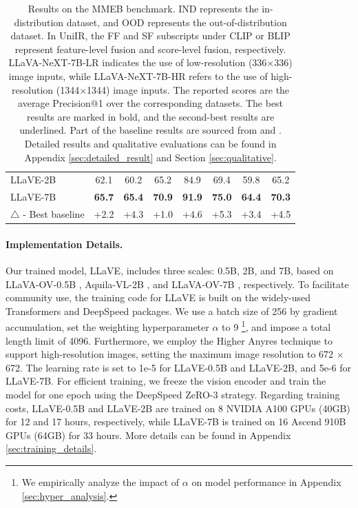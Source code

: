 \documentclass[11pt]{article}
\begin{document}
\begin{table}[t]
\begin{tabular}{lccccccc}
LLaVE-2B                                            & 62.1           & 60.2          & 65.2          & 84.9          & 69.4          & 59.8          & 65.2          \\
LLaVE-7B                                            & \textbf{65.7}  & \textbf{65.4} & \textbf{70.9} & \textbf{91.9} & \textbf{75.0} & \textbf{64.4} & \textbf{70.3} \\
\rowcolor[HTML]{FFFACD}
$\triangle$ - Best baseline                                            & +2.2  & +4.3 & +1.0 & +4.6 & +5.3 & +3.4 & +4.5 \\

\bottomrule
\end{tabular}
\vspace{-0.2cm}
\caption{Results on the MMEB benchmark. IND represents the in-distribution dataset, and OOD represents the out-of-distribution dataset. In UniIR, the FF and SF subscripts under CLIP or BLIP represent feature-level fusion and score-level fusion, respectively. LLaVA-NeXT-7B-LR indicates the use of low-resolution (336×336) image inputs, while LLaVA-NeXT-7B-HR refers to the use of high-resolution (1344×1344) image inputs. The reported scores are the average Precision@1 over the corresponding datasets. The best results are marked in bold, and the second-best results are underlined. Part of the baseline results are sourced from \cite{VLM2Vec} and \cite{MMRet}. Detailed results and qualitative evaluations can be found in Appendix \ref{sec:detailed_result} and Section \ref{sec:qualitative}.}
\label{tab:main_results}
\end{table}

\paragraph{Implementation Details.} 
Our trained model, LLaVE, includes three scales: 0.5B, 2B, and 7B, based on LLaVA-OV-0.5B \cite{LLaVA-OV}, Aquila-VL-2B \cite{DBLP:journals/corr/abs-2410-18558}, and LLaVA-OV-7B \cite{LLaVA-OV}, respectively. To facilitate community use, the training code for LLaVE is built on the widely-used Transformers \cite{Transformers} and DeepSpeed \cite{Deepspeed} packages. We use a batch size of 256 by gradient accumulation, set the weighting hyperparameter $\alpha$ to 9 \footnote{We empirically analyze the impact of $\alpha$ on model performance in Appendix \ref{sec:hyper_analysis}.}, and impose a total length limit of 4096. Furthermore, we employ the Higher Anyres technique \cite{LLaVA-OV} to support high-resolution images, setting the maximum image resolution to 672 $\times$ 672. The learning rate is set to 1e-5 for LLaVE-0.5B and LLaVE-2B, and 5e-6 for LLaVE-7B.
For efficient training, we freeze the vision encoder and train the model for one epoch using the DeepSpeed ZeRO-3 strategy. Regarding training costs, LLaVE-0.5B and LLaVE-2B are trained on 8 NVIDIA A100 GPUs (40GB) for 12 and 17 hours, respectively, while LLaVE-7B is trained on 16 Ascend 910B GPUs (64GB) for 33 hours. More details can be found in Appendix \ref{sec:training_details}.
\end{document}
